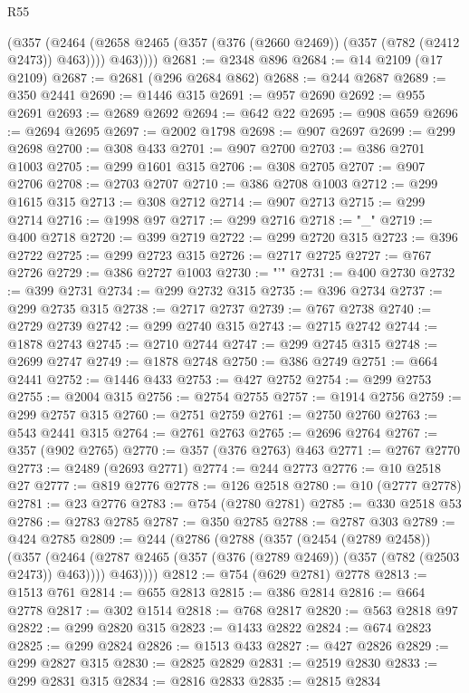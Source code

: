 \begin{lexlean}{R55}
\begin{coremodule}
          (@357
            (@2464 (@2658 @2465 (@357 (@376 (@2660 @2469)) (@357 (@782 (@2412 @2473)) @463))))
            @463))))
@2681 := @2348 @896
@2684 := @14 @2109 (@17 @2109)
@2687 := @2681 (@296 @2684 @862)
@2688 := @244 @2687
@2689 := @350 @2441
@2690 := @1446 @315
@2691 := @957 @2690
@2692 := @955 @2691
@2693 := @2689 @2692
@2694 := @642 @22
@2695 := @908 @659
@2696 := @2694 @2695
@2697 := @2002 @1798
@2698 := @907 @2697
@2699 := @299 @2698
@2700 := @308 @433
@2701 := @907 @2700
@2703 := @386 @2701 @1003
@2705 := @299 @1601 @315
@2706 := @308 @2705
@2707 := @907 @2706
@2708 := @2703 @2707
@2710 := @386 @2708 @1003
@2712 := @299 @1615 @315
@2713 := @308 @2712
@2714 := @907 @2713
@2715 := @299 @2714
@2716 := @1998 @97
@2717 := @299 @2716
@2718 := "_"
@2719 := @400 @2718
@2720 := @399 @2719
@2722 := @299 @2720 @315
@2723 := @396 @2722
@2725 := @299 @2723 @315
@2726 := @2717 @2725
@2727 := @767 @2726
@2729 := @386 @2727 @1003
@2730 := "'"
@2731 := @400 @2730
@2732 := @399 @2731
@2734 := @299 @2732 @315
@2735 := @396 @2734
@2737 := @299 @2735 @315
@2738 := @2717 @2737
@2739 := @767 @2738
@2740 := @2729 @2739
@2742 := @299 @2740 @315
@2743 := @2715 @2742
@2744 := @1878 @2743
@2745 := @2710 @2744
@2747 := @299 @2745 @315
@2748 := @2699 @2747
@2749 := @1878 @2748
@2750 := @386 @2749
@2751 := @664 @2441
@2752 := @1446 @433
@2753 := @427 @2752
@2754 := @299 @2753
@2755 := @2004 @315
@2756 := @2754 @2755
@2757 := @1914 @2756
@2759 := @299 @2757 @315
@2760 := @2751 @2759
@2761 := @2750 @2760
@2763 := @543 @2441 @315
@2764 := @2761 @2763
@2765 := @2696 @2764
@2767 := @357 (@902 @2765)
@2770 := @357 (@376 @2763) @463
@2771 := @2767 @2770
@2773 := @2489 (@2693 @2771)
@2774 := @244 @2773
@2776 := @10 @2518 @27
@2777 := @819 @2776
@2778 := @126 @2518
@2780 := @10 (@2777 @2778)
@2781 := @23 @2776
@2783 := @754 (@2780 @2781)
@2785 := @330 @2518 @53
@2786 := @2783 @2785
@2787 := @350 @2785
@2788 := @2787 @303
@2789 := @424 @2785
@2809 := @244
    (@2786
      (@2788
        (@357
          (@2454 (@2789 @2458))
          (@357
            (@2464 (@2787 @2465 (@357 (@376 (@2789 @2469)) (@357 (@782 (@2503 @2473)) @463))))
            @463))))
@2812 := @754 (@629 @2781) @2778
@2813 := @1513 @761
@2814 := @655 @2813
@2815 := @386 @2814
@2816 := @664 @2778
@2817 := @302 @1514
@2818 := @768 @2817
@2820 := @563 @2818 @97
@2822 := @299 @2820 @315
@2823 := @1433 @2822
@2824 := @674 @2823
@2825 := @299 @2824
@2826 := @1513 @433
@2827 := @427 @2826
@2829 := @299 @2827 @315
@2830 := @2825 @2829
@2831 := @2519 @2830
@2833 := @299 @2831 @315
@2834 := @2816 @2833
@2835 := @2815 @2834

\end{coremodule}
\end{lexlean}
